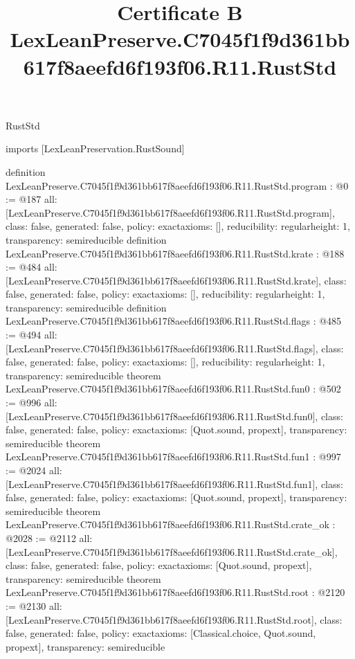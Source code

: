 \begin{lexlean}{RustStd}
\title{Certificate B LexLeanPreserve.C7045f1f9d361bb617f8aeefd6f193f06.R11.RustStd}
\begin{coremodule}
imports [LexLeanPreservation.RustSound]

definition LexLeanPreserve.C7045f1f9d361bb617f8aeefd6f193f06.R11.RustStd.program : @0 := @187 {
  all: [LexLeanPreserve.C7045f1f9d361bb617f8aeefd6f193f06.R11.RustStd.program],
  class: false,
  generated: false,
  policy: exact{axioms: []},
  reducibility: regular{height: 1},
  transparency: semireducible
}
definition LexLeanPreserve.C7045f1f9d361bb617f8aeefd6f193f06.R11.RustStd.krate : @188 := @484 {
  all: [LexLeanPreserve.C7045f1f9d361bb617f8aeefd6f193f06.R11.RustStd.krate],
  class: false,
  generated: false,
  policy: exact{axioms: []},
  reducibility: regular{height: 1},
  transparency: semireducible
}
definition LexLeanPreserve.C7045f1f9d361bb617f8aeefd6f193f06.R11.RustStd.flags : @485 := @494 {
  all: [LexLeanPreserve.C7045f1f9d361bb617f8aeefd6f193f06.R11.RustStd.flags],
  class: false,
  generated: false,
  policy: exact{axioms: []},
  reducibility: regular{height: 1},
  transparency: semireducible
}
theorem LexLeanPreserve.C7045f1f9d361bb617f8aeefd6f193f06.R11.RustStd.fun0 : @502 := @996 {
  all: [LexLeanPreserve.C7045f1f9d361bb617f8aeefd6f193f06.R11.RustStd.fun0],
  class: false,
  generated: false,
  policy: exact{axioms: [Quot.sound, propext]},
  transparency: semireducible
}
theorem LexLeanPreserve.C7045f1f9d361bb617f8aeefd6f193f06.R11.RustStd.fun1 : @997 := @2024 {
  all: [LexLeanPreserve.C7045f1f9d361bb617f8aeefd6f193f06.R11.RustStd.fun1],
  class: false,
  generated: false,
  policy: exact{axioms: [Quot.sound, propext]},
  transparency: semireducible
}
theorem LexLeanPreserve.C7045f1f9d361bb617f8aeefd6f193f06.R11.RustStd.crate_ok : @2028 := @2112 {
  all: [LexLeanPreserve.C7045f1f9d361bb617f8aeefd6f193f06.R11.RustStd.crate_ok],
  class: false,
  generated: false,
  policy: exact{axioms: [Quot.sound, propext]},
  transparency: semireducible
}
theorem LexLeanPreserve.C7045f1f9d361bb617f8aeefd6f193f06.R11.RustStd.root : @2120 := @2130 {
  all: [LexLeanPreserve.C7045f1f9d361bb617f8aeefd6f193f06.R11.RustStd.root],
  class: false,
  generated: false,
  policy: exact{axioms: [Classical.choice, Quot.sound, propext]},
  transparency: semireducible
}


\end{coremodule}
\end{lexlean}
